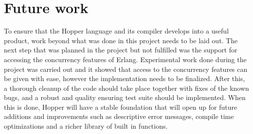 \section{Future work}

To ensure that the Hopper language and its compiler develops into a useful product, work beyond what was done in this project needs to be laid out. The next step that was planned in the project but not fulfilled was the support for accessing the concurrency features of Erlang. Experimental work done during the project was carried out and it showed that access to the concurrency features can be given with ease, however the implementation needs to be finalized. After this, a thorough cleanup of the code should take place together with fixes of the known bugs, and a robust and quality ensuring test suite should be implemented. When this is done, Hopper will have a stable foundation that will open up for future additions and improvements such as descriptive error messages, compile time optimizations and a richer library of built in functions. 
